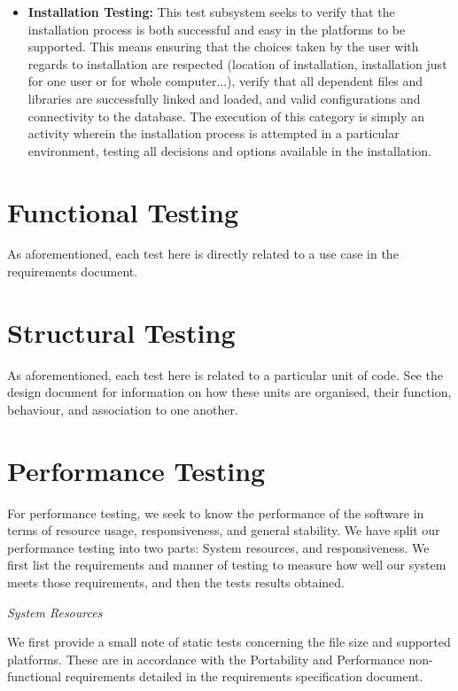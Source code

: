 \documentclass[12pt]{article}
\newcounter{req ID}
\begin{document}
\begin{itemize}
    \item \textbf{Installation Testing:} This test subsystem seeks to verify that the installation process is both successful and easy in the platforms to be supported. This means ensuring that the choices taken by the user with regards to installation are respected (location of installation, installation just for one user or for whole computer...), verify that all dependent files and libraries are successfully linked and loaded, and valid configurations and connectivity to the database. The execution of this category is simply an activity wherein the installation process is attempted in a particular environment, testing all decisions and options available in the installation.
\end{itemize}

\section{Functional Testing}

As aforementioned, each test here is directly related to a use case in the requirements document.



\section{Structural Testing}

As aforementioned, each test here is related to a particular unit of code. See the design document for information on how these units are organised, their function, behaviour, and association to one another.


\section{Performance Testing}

For performance testing, we seek to know the performance of the software in terms of resource usage, responsiveness, and general stability. We have split our performance testing into two parts: System resources, and responsiveness. We first list the requirements and manner of testing to measure how well our system meets those requirements, and then the tests results obtained.

\textit{System Resources}

We first provide a small note of static tests concerning the file size and supported platforms. These are in accordance with the Portability and Performance non-functional requirements detailed in the requirements specification document.
\end{document}
